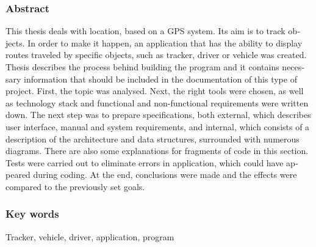 \subsubsection*{Abstract} 
\begin{otherlanguage}{british}
This thesis deals with location, based on a GPS system. Its aim is to track objects. In order to make it happen, an application that has the ability to display routes traveled by specific objects, such as tracker, driver or vehicle was created. Thesis describes the process behind building the program and it contains necessary information that should be included in the documentation of this type of project. First, the topic was analysed. Next, the right tools were chosen, as well as technology stack and functional and non-functional requirements were written down. The next step was to prepare specifications, both external, which describes user interface, manual and system requirements, and internal, which consists of a description of the architecture and data structures, surrounded with numerous diagrams. There are also some explanations for fragments of code in this section. Tests were carried out to eliminate errors in application, which could have appeared during coding. At the end, conclusions were made and the effects were compared to the previously set goals.
\end{otherlanguage}
\subsubsection*{Key words}  
\begin{otherlanguage}{british}
Tracker, vehicle, driver, application, program
\end{otherlanguage}

